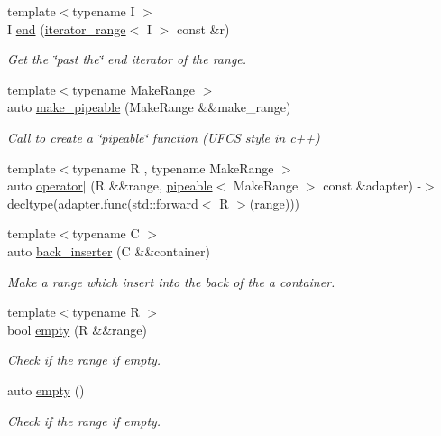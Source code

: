 \begin{DoxyCompactItemize}
{\footnotesize template$<$typename I $>$ }\\I \mbox{\hyperlink{namespacerah_a6b31fe80bf81abf3149df010cb265e20}{end}} (\mbox{\hyperlink{structrah_1_1iterator__range}{iterator\+\_\+range}}$<$ I $>$ const \&r)
\begin{DoxyCompactList}\small\item\em Get the \char`\"{}past the\char`\"{} end iterator of the range. \end{DoxyCompactList}\item 
{\footnotesize template$<$typename Make\+Range $>$ }\\auto \mbox{\hyperlink{namespacerah_a9beb2a94a054fd0caefd5a20b1c0f0d9}{make\+\_\+pipeable}} (Make\+Range \&\&make\+\_\+range)
\begin{DoxyCompactList}\small\item\em Call to create a \char`\"{}pipeable\char`\"{} function (U\+F\+CS style in c++) \end{DoxyCompactList}\item 
{\footnotesize template$<$typename R , typename Make\+Range $>$ }\\auto \mbox{\hyperlink{namespacerah_a5ebb23bb276c853ef14a86bed84b6df9}{operator$\vert$}} (R \&\&range, \mbox{\hyperlink{structrah_1_1pipeable}{pipeable}}$<$ Make\+Range $>$ const \&adapter) -\/$>$ decltype(adapter.\+func(std\+::forward$<$ R $>$(range)))
\item 
{\footnotesize template$<$typename C $>$ }\\auto \mbox{\hyperlink{namespacerah_a0698f952bc3c4f1961929bbddb5812fe}{back\+\_\+inserter}} (C \&\&container)
\begin{DoxyCompactList}\small\item\em Make a range which insert into the back of the a container. \end{DoxyCompactList}\item 
{\footnotesize template$<$typename R $>$ }\\bool \mbox{\hyperlink{namespacerah_a51feb1497566c28de396f50735fd259b}{empty}} (R \&\&range)
\begin{DoxyCompactList}\small\item\em Check if the range if empty. \end{DoxyCompactList}\item 
auto \mbox{\hyperlink{namespacerah_a6ceb90c934b1c4927ab4e08b985ef6c5}{empty}} ()
\begin{DoxyCompactList}\small\item\em Check if the range if empty. \end{DoxyCompactList}\item 

\end{DoxyCompactItemize}
